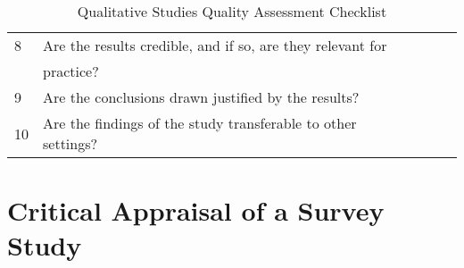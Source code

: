 \begin{table}[H]
\begin{center}
{\begin{tabular}{|l||l|l|l|l|}
                        \hline
                        8  & Are the results credible, and if so, are they relevant for       &&& \\
                           & practice?                                                        &&& \\
                        \hline
                        9  & Are the conclusions drawn justified by the results?              &&& \\
                        \hline
                        10 & Are the findings of the study transferable to other settings?    &&& \\
                        \hline
                \end{tabular}}
        \end{center}
        \caption{Qualitative Studies Quality Assessment Checklist}
        \label{table:qualitativeStudy}
\end{table}
    

\section{Critical Appraisal of a Survey Study}

